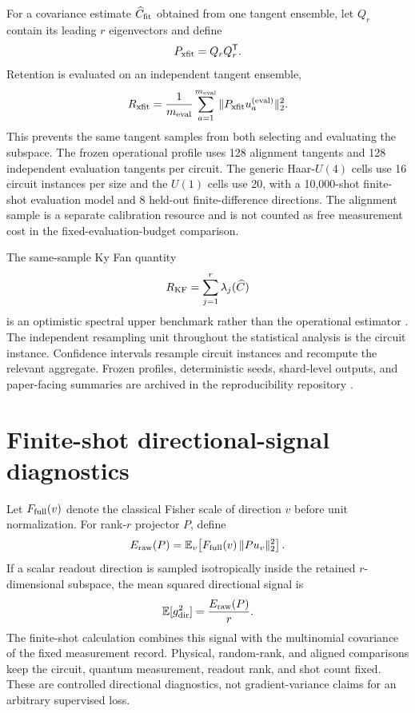 \documentclass[ASNA,twocolumn]{USG}
\begin{document}
For a covariance estimate $\widehat C_{\rm fit}$ obtained from one tangent ensemble, let $Q_r$ contain its leading $r$ eigenvectors and define
\begin{equation}
P_{\rm xfit}=Q_rQ_r^{\mathsf T}.
\end{equation}
Retention is evaluated on an independent tangent ensemble,
\begin{equation}
 R_{\rm xfit}=\frac1{m_{\rm eval}}\sum_{a=1}^{m_{\rm eval}}
\|P_{\rm xfit}u_a^{\rm(eval)}\|_2^2.
\label{eq:si-crossfit}
\end{equation}
This prevents the same tangent samples from both selecting and evaluating the subspace. The frozen operational profile uses 128 alignment tangents and 128 independent evaluation tangents per circuit. The generic Haar-$U(4)$ cells use 16 circuit instances per size and the $U(1)$ cells use 20, with a 10,000-shot finite-shot evaluation model and 8 held-out finite-difference directions. The alignment sample is a separate calibration resource and is not counted as free measurement cost in the fixed-evaluation-budget comparison.

The same-sample Ky Fan quantity
\begin{equation}
R_{\rm KF}=\sum_{j=1}^r\lambda_j(\widehat C)
\end{equation}
is an optimistic spectral upper benchmark rather than the operational estimator \cite{KyFan1949}. The independent resampling unit throughout the statistical analysis is the circuit instance. Confidence intervals resample circuit instances and recompute the relevant aggregate. Frozen profiles, deterministic seeds, shard-level outputs, and paper-facing summaries are archived in the reproducibility repository \cite{AitHaddou2026MeasurementAccessible}.

\section{Finite-shot directional-signal diagnostics}

Let $F_{\rm full}(v)$ denote the classical Fisher scale of direction $v$ before unit normalization. For rank-$r$ projector $P$, define
\begin{equation}
E_{\rm raw}(P)=\mathbb E_v\!\left[F_{\rm full}(v)\,\|Pu_v\|_2^2\right].
\label{eq:si-raw-energy}
\end{equation}
If a scalar readout direction is sampled isotropically inside the retained $r$-dimensional subspace, the mean squared directional signal is
\begin{equation}
\mathbb E[g_{\rm dir}^2]=\frac{E_{\rm raw}(P)}{r}.
\label{eq:si-dir-signal}
\end{equation}
The finite-shot calculation combines this signal with the multinomial covariance of the fixed measurement record. Physical, random-rank, and aligned comparisons keep the circuit, quantum measurement, readout rank, and shot count fixed. These are controlled directional diagnostics, not gradient-variance claims for an arbitrary supervised loss.
\end{document}
